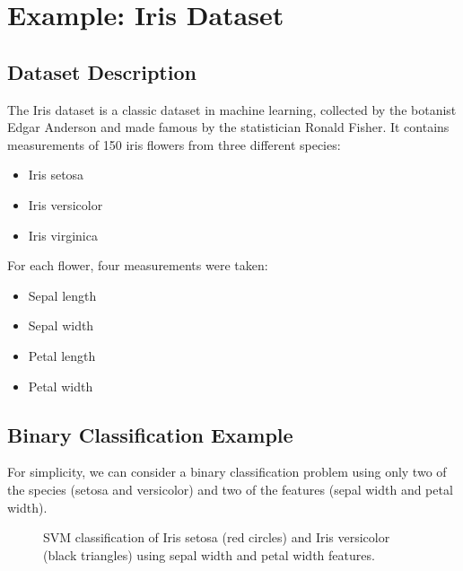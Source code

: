\documentclass{article}
\begin{document}
\section{Example: Iris Dataset}

\subsection{Dataset Description}
The Iris dataset is a classic dataset in machine learning, collected by the botanist Edgar Anderson and made famous by the statistician Ronald Fisher. It contains measurements of 150 iris flowers from three different species:

\begin{itemize}
    \item Iris setosa
    \item Iris versicolor
    \item Iris virginica
\end{itemize}

For each flower, four measurements were taken:
\begin{itemize}
    \item Sepal length
    \item Sepal width
    \item Petal length
    \item Petal width
\end{itemize}

\subsection{Binary Classification Example}
For simplicity, we can consider a binary classification problem using only two of the species (setosa and versicolor) and two of the features (sepal width and petal width).

\begin{figure}[h]
\centering
{}
\caption{SVM classification of Iris setosa (red circles) and Iris versicolor (black triangles) using sepal width and petal width features.}
\end{figure}
\end{document}
